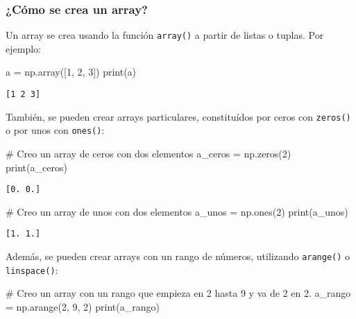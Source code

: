 \documentclass[
  letterpaper,
  DIV=11,
  numbers=noendperiod]{scrreprt}
\newenvironment{Shaded}{\begin{snugshade}}{\end{snugshade}}
\newcommand{\BuiltInTok}[1]{\textcolor[rgb]{0.00,0.23,0.31}{#1}}
\newcommand{\CommentTok}[1]{\textcolor[rgb]{0.37,0.37,0.37}{#1}}
\newcommand{\DecValTok}[1]{\textcolor[rgb]{0.68,0.00,0.00}{#1}}
\newcommand{\NormalTok}[1]{\textcolor[rgb]{0.00,0.23,0.31}{#1}}
\newcommand{\OperatorTok}[1]{\textcolor[rgb]{0.37,0.37,0.37}{#1}}
\begin{document}
\subsubsection{\texorpdfstring{¿Cómo se crea un
\textbf{array}?}{¿Cómo se crea un array?}}\label{cuxf3mo-se-crea-un-array}

Un array se crea usando la función \texttt{array()} a partir de listas o
tuplas. Por ejemplo:

\begin{Shaded}
\begin{Highlighting}[]
\NormalTok{a }\OperatorTok{=}\NormalTok{ np.array([}\DecValTok{1}\NormalTok{, }\DecValTok{2}\NormalTok{, }\DecValTok{3}\NormalTok{])}
\BuiltInTok{print}\NormalTok{(a)}
\end{Highlighting}
\end{Shaded}

\begin{verbatim}
[1 2 3]
\end{verbatim}

También, se pueden crear arrays particulares, constituídos por ceros con
\texttt{zeros()} o por unos con \texttt{ones()}:

\begin{Shaded}
\begin{Highlighting}[]
\CommentTok{\# Creo un array de ceros con dos elementos}
\NormalTok{a\_ceros }\OperatorTok{=}\NormalTok{ np.zeros(}\DecValTok{2}\NormalTok{)}
\BuiltInTok{print}\NormalTok{(a\_ceros)}
\end{Highlighting}
\end{Shaded}

\begin{verbatim}
[0. 0.]
\end{verbatim}

\begin{Shaded}
\begin{Highlighting}[]
\CommentTok{\# Creo un array de unos con dos elementos}
\NormalTok{a\_unos }\OperatorTok{=}\NormalTok{ np.ones(}\DecValTok{2}\NormalTok{)}
\BuiltInTok{print}\NormalTok{(a\_unos)}
\end{Highlighting}
\end{Shaded}

\begin{verbatim}
[1. 1.]
\end{verbatim}

Además, se pueden crear arrays con un rango de números, utilizando
\texttt{arange()} o \texttt{linspace()}:

\begin{Shaded}
\begin{Highlighting}[]
\CommentTok{\# Creo un array con un rango que empieza en 2 hasta 9 y va de 2 en 2.}
\NormalTok{a\_rango }\OperatorTok{=}\NormalTok{ np.arange(}\DecValTok{2}\NormalTok{, }\DecValTok{9}\NormalTok{, }\DecValTok{2}\NormalTok{)}
\BuiltInTok{print}\NormalTok{(a\_rango)}
\end{Highlighting}
\end{Shaded}
\end{document}
